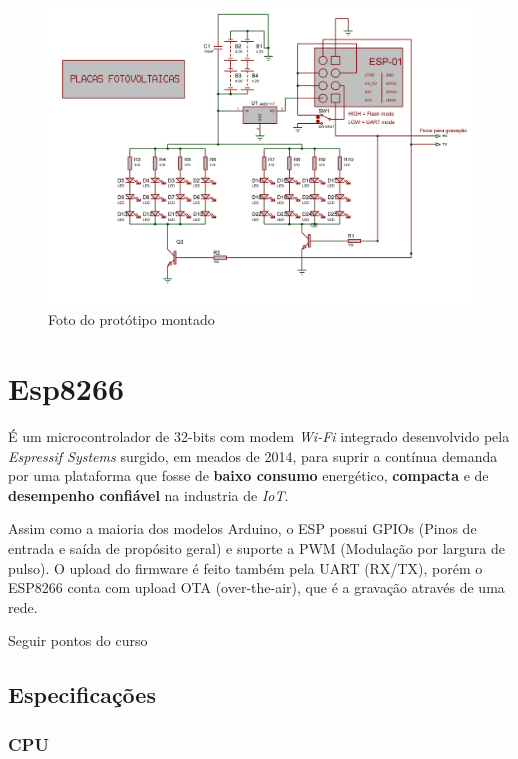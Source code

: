 \documentclass[
12pt,				%
openany,			%
twoside,			%
a4paper,			%
english,			%
french,				%
spanish,			%
brazil,				%
]{abntex2}
\begin{document}
\begin{figure}[ht!]
    \includegraphics[width=450pt]{images/circuit.png}
    \caption{Foto do protótipo montado}
\end{figure}

\chapter{Esp8266}
É um microcontrolador de 32-bits com modem \textit{Wi-Fi} integrado desenvolvido pela \textit{Espressif Systems}
surgido, em meados de 2014, para suprir a contínua demanda por uma plataforma que fosse de \textsf{\textbf{baixo consumo}} 
energético, \textsf{\textbf{compacta}} e de \textsf{\textbf{desempenho confiável}} na industria de \textit{IoT}.

Assim como a maioria dos modelos Arduino, o ESP possui GPIOs (Pinos de entrada e saída de propósito geral)
e suporte a PWM (Modulação por largura de pulso). O upload do firmware é feito também pela UART (RX/TX), 
porém o ESP8266 conta com upload OTA (over-the-air), que é a gravação através de uma rede.  

Seguir pontos do curso
\section{Especificações}

\subsection{CPU}
\end{document}

